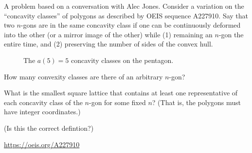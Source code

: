 \documentclass{article}
\begin{document}
  A problem based on a conversation with Alec Jones. Consider a variation on the
  ``concavity classes'' of polygons as described by OEIS sequence A227910.
  Say that two $n$-gons are in the same concavity class if one can be
  continuously deformed into the other (or a mirror image of the other) while
  (1) remaining an $n$-gon the entire time, and (2) preserving the number of
  sides of the convex hull.
  \begin{figure}[ht!]
    \centering
    \hspace{0.5cm}
    \hspace{0.5cm}
    \hspace{0.5cm}
    \hspace{0.5cm}
    \caption{
      The $a(5) = 5$ concavity classes on the pentagon.
    }
  \end{figure}
  \begin{question}
    How many convexity classes are there of an arbitrary $n$-gon?
  \end{question}

  \begin{related}
    \item What is the smallest square lattice that contains at least one
      representative of each concavity class of the $n$-gon for some fixed $n$?
      (That is, the polygons must have integer coordinates.)
    \item (Is this the correct defintion?)
  \end{related}
  \begin{references}
    \item \url{https://oeis.org/A227910}
  \end{references}
\end{document}
